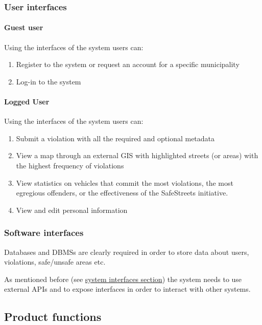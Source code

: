 \subsubsection{User interfaces}		
\paragraph{Guest user}
	Using the interfaces of the system users can:
	\begin{enumerate}
		\item Register to the system or request an account for a specific municipality
		\item Log-in to the system
	\end{enumerate}
\paragraph{Logged User}
	Using the interfaces of the system users can:
	\begin{enumerate}
		\item Submit a violation with all the required and optional metadata
		\item View a map through an external GIS with highlighted streets (or areas) with the highest frequency of violations
		\item View statistics on vehicles that commit the most violations, the most egregious offenders, or the effectiveness of the SafeStreets initiative.
		\item View and edit personal information
	\end{enumerate}
	
\subsubsection{Software interfaces}
Databases and DBMSs are clearly required in order to store data about users, violations, safe/unsafe areas etc.

As mentioned before (see \hyperref[sec:systemInterfaces]{system interfaces section}) the system needs to use external APIs and to expose interfaces in order to interact with other systems.

\subsection{Product functions}
\todo{}

